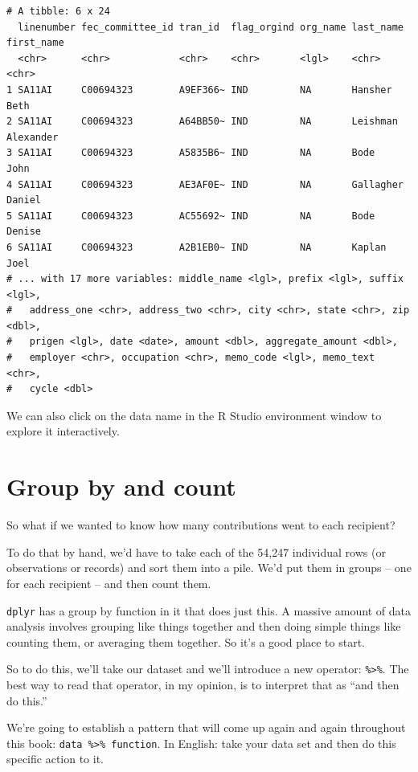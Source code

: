 \documentclass[
  letterpaper,
  DIV=11,
  numbers=noendperiod]{scrreprt}
\begin{document}
\begin{verbatim}
# A tibble: 6 x 24
  linenumber fec_committee_id tran_id  flag_orgind org_name last_name first_name
  <chr>      <chr>            <chr>    <chr>       <lgl>    <chr>     <chr>     
1 SA11AI     C00694323        A9EF366~ IND         NA       Hansher   Beth      
2 SA11AI     C00694323        A64BB50~ IND         NA       Leishman  Alexander 
3 SA11AI     C00694323        A5835B6~ IND         NA       Bode      John      
4 SA11AI     C00694323        AE3AF0E~ IND         NA       Gallagher Daniel    
5 SA11AI     C00694323        AC55692~ IND         NA       Bode      Denise    
6 SA11AI     C00694323        A2B1EB0~ IND         NA       Kaplan    Joel      
# ... with 17 more variables: middle_name <lgl>, prefix <lgl>, suffix <lgl>,
#   address_one <chr>, address_two <chr>, city <chr>, state <chr>, zip <dbl>,
#   prigen <lgl>, date <date>, amount <dbl>, aggregate_amount <dbl>,
#   employer <chr>, occupation <chr>, memo_code <lgl>, memo_text <chr>,
#   cycle <dbl>
\end{verbatim}

We can also click on the data name in the R Studio environment window to
explore it interactively.

\hypertarget{group-by-and-count}{%
\section{Group by and count}\label{group-by-and-count}}

So what if we wanted to know how many contributions went to each
recipient?

To do that by hand, we'd have to take each of the 54,247 individual rows
(or observations or records) and sort them into a pile. We'd put them in
groups -- one for each recipient -- and then count them.

\texttt{dplyr} has a group by function in it that does just this. A
massive amount of data analysis involves grouping like things together
and then doing simple things like counting them, or averaging them
together. So it's a good place to start.

So to do this, we'll take our dataset and we'll introduce a new
operator: \texttt{\%\textgreater{}\%}. The best way to read that
operator, in my opinion, is to interpret that as ``and then do this.''

We're going to establish a pattern that will come up again and again
throughout this book: \texttt{data\ \%\textgreater{}\%\ function}. In
English: take your data set and then do this specific action to it.
\end{document}
